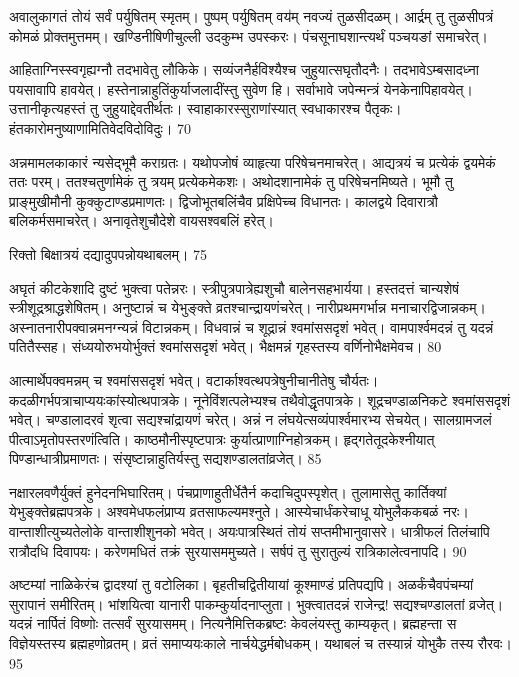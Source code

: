 अवालुकागतं तोयं सर्वं पर्युषितम् स्मृतम्।
 पुष्पम् पर्युषितम् वय॑म् नवज्यं तुळसीदळम्।
 आर्द्रम् तु तुळसीपत्रं कोमळं प्रोक्तमुत्तमम्।
 खण्डिनीषिणीचुल्ली उदकुम्भ उपस्करः।
 पंचसूनाघशान्त्यर्थं पञ्चयङां समाचरेत्।
 
आहिताग्निस्स्वगृह्यग्नौ तदभावेतु लौकिके।
 सव्यंजनैर्हविश्यैश्च जुहुयात्सघृतौदनैः।
 तदभावेऽम्बसादध्ना पयसावापि हावयेत्।
 हस्तेनान्नाहुतिंकुर्याजलादींस्तु सुवेण हि।
 सर्वाभावे जपेन्मन्त्रं येनकेनापिहावयेत्।
 उत्तानीकृत्यहस्तं तु जुहुयाद्देवतीर्थतः।
 स्वाहाकारस्सुराणांस्यात् स्वधाकारश्च पैतृकः।
 हंतकारोमनुष्याणामितिवेदविदोविदुः।
 70

  अन्नमामलकाकारं न्यसेद्भूमै कराग्रतः।
 यथोपजोषं व्याहृत्या परिषेचनमाचरेत्।
 आद्यत्रयं च प्रत्येकं द्वयमेकं ततः परम्।
 ततश्चतुर्णामेकं तु त्रयम् प्रत्येकमेकशः।
 अथोदशानामेकं तु परिषेचनमिष्यते।
 भूमौ तु प्राङ्मुखीमौनी कुक्कुटाण्डप्रमाणतः।
 द्विजोभूतबलिंचैव प्रक्षिपेच्च विधानतः।
 कालद्वये दिवारात्रौ बलिकर्मसमाचरेत्।
 अनावृतेशुचौदेशे वायसश्वबलिं हरेत्।
 
रिक्तो बिक्षात्रयं दद्यादुपपन्नोयथाबलम्।
 75

  अघृतं कीटकेशादि दुष्टं भुक्त्वा पतेन्नरः।
 स्त्रीपुत्रपात्रेह्यशुचौ बालेनसहभार्यया।
 हस्तदत्तं चान्यशेषं स्त्रीशूद्रश्राद्धशेषितम्।
 अनुष्टान्नं च येभुङ्क्ते व्रतश्चान्द्रायणंचरेत्।
 नारीप्रथमगर्भान्न मनाचारद्विजान्नकम्।
 अस्नातनारीपक्वान्नमनग्न्यन्नं विटान्नकम्।
 विधवान्नं च शूद्रान्नं श्वमांससदृशं भवेत्।
 वामपार्श्वमदन्नं तु यदन्नं पतितैस्सह।
 संध्ययोरुभयोर्भुक्तं श्वमांससदृशं भवेत्।
 भैक्षमन्नं गृहस्तस्य वर्णिनोभैक्षमेवच।
 80

  आत्मार्थेपक्वमन्नम् च श्वमांससदृशं भवेत्।
 वटार्काश्वत्थपत्रेषुनीचानीतेषु चौर्यतः।
 कदळीगर्भपत्राचाप्ययःकांस्योत्थपात्रके।
 नूनेविंशत्पलेभ्यश्च तथैवोद्धृतपात्रके।
 शूद्रचण्डाळनिकटे श्वमांससदृशं भवेत्।
 चण्डालादरवं शृत्वा सद्यश्चांद्रायणं चरेत्।
 अन्नं न लंघयेत्सव्यंपार्श्वमारभ्य सेचयेत्।
 सालग्रामजलं पीत्वाऽमृतोपस्तरणंत्विति।
 काष्ठमौनीस्पृष्टपात्रः कुर्यात्प्राणाग्निहोत्रकम्।
 हृद्गतेतूदकेश्नीयात् पिण्डान्धात्रीप्रमाणतः।
 संसृष्टान्नाहुतिर्यस्तु सद्यशण्डालतांव्रजेत्।
 85

 
नक्षारलवणैर्युक्तं हुनेदनभिघारितम्।
 पंचप्राणाहुतीर्धेतैर्न कदाचिदुपस्पृशेत्।
 तुलामासेतु कार्तिक्यां येभुङ्क्तेब्रह्मपत्रके।
 अश्वमेधफलंप्राप्य व्रतसाफल्यमश्नुते।
 आस्येचार्धंकरेचाधू योभुलैककबळं नरः।
 वान्ताशीत्युच्यतेलोके वान्ताशीशुनको भवेत्।
 अयःपात्रस्थितं तोयं सप्तमीभानुवासरे।
 धात्रीफलं तिलंचापि रात्रौदधि दिवापयः।
 करेणमधितं तक्रं सुरयासममुच्यते।
 सर्षपं तु सुरातुल्यं रात्रिकालेत्वनापदि।
 90

  अष्टम्यां नाळिकेरंच द्वादश्यां तु वटोलिका।
 बृहतीचद्वितीयायां कूश्माण्डं प्रतिपद्यपि।
 अळर्कंचैवपंचम्यां सुरापानं समीरितम्।
 भांशयित्वा यानारी पाकम्कुर्यादनाप्लुता।
 भुक्त्वातदन्नं राजेन्द्र! सद्यश्चण्डालतां व्रजेत्।
 यदन्नं नार्पितं विष्णोः तत्सर्वं सुरयासमम्।
 नित्यनैमित्तिकब्रष्टः केवलंयस्तु काम्यकृत्।
 ब्रह्महन्ता स विज्ञेयस्तस्य ब्रह्महणोव्रतम्।
 व्रतं समाप्ययःकाले नार्चयेद्धर्मबोधकम्।
 यथाबलं च तस्यान्नं योभुकै तस्य रौरवः।
 95

